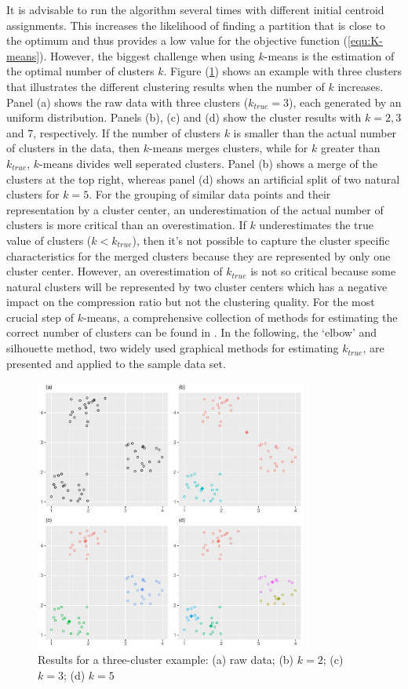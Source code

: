 It is advisable to run the algorithm several times with different initial centroid assignments. This increases the likelihood of finding a partition that is close to the optimum and thus provides a low value for the objective function (\ref{equ:K-means}). However, the biggest challenge when using $k$-means is the estimation of the optimal number of clusters $k$. Figure (\ref{fig:cluster_centers}) shows an example with three clusters that illustrates the different clustering results when the number of $k$  increases. Panel (a) shows the raw data with three clusters ($k_{true} = 3$), each generated by an uniform distribution. Panels (b), (c) and (d) show the cluster results with $k = 2, 3 $ and $7$, respectively. If the number of clusters $k$ is smaller than the actual number of clusters in the data, then $k$-means merges clusters, while for $k$ greater than $k_{true}$, $k$-means divides well seperated clusters. Panel (b) shows a merge of the clusters at the top right, whereas panel (d) shows an artificial split of two natural clusters for $k=5$. For the grouping of similar data points and their representation by a cluster center, an underestimation of the actual number of clusters is more critical than an overestimation. If $k$ underestimates the true value of clusters ($k < k_{true}$), then it's  not possible to capture the cluster specific characteristics for the merged clusters because they are represented by only one cluster center. However, an overestimation of $k_{true}$ is not so critical because some natural clusters will be represented by two cluster centers which has a negative impact on the compression ratio but not the clustering quality. For the most crucial step of $k$-means, a comprehensive collection of methods for estimating the correct number of clusters can be found in \cite{milligan1985examination}. In the following, the `elbow' and silhouette method, two widely used graphical methods for estimating $k_{true}$, are presented and applied to the sample data set. 
\begin{figure}
	\centering
	\includegraphics[width=0.8\textwidth]{figures/chapter_k_means/cluster_centers}
	\caption{Results for a three-cluster example: (a) raw data; (b) $k=2$; (c) $k=3$; (d) $k=5$}
	\label{fig:cluster_centers}
\end{figure}


